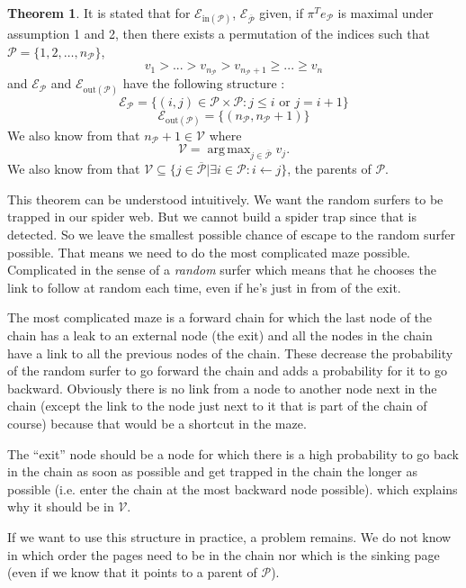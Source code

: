 \documentclass{article}
\DeclareMathOperator*{\argmax}{arg\,max}
\newcommand{\1}{\mathbf{1}}
\theoremstyle{definition}
\newtheorem{mytheo}[mydef]{Theorem}
\begin{document}
\begin{mytheo}
  It is stated that for \(\mathcal{E}_{\text{in}(\mathcal{P})}\), \(\mathcal{E}_{\overline{\mathcal{P}}}\) given, if  \(\pi^T e_{\mathcal{P}}\) is maximal under assumption 1 and 2, then there exists a permutation of the indices such that
\(\mathcal{P} = \{1,2, \hdots, n_{\mathcal{P}}\}\),
\[ v_1 > ... > v_{n_\mathcal{P}}>v_{n_{\mathcal{P}}+1} \geq ... \geq v_n\]
and \(\mathcal{E}_{\mathcal{P}}\) and \(\mathcal{E}_{\text{out}(\mathcal{P})} \) have the following structure :
\[\mathcal{E}_{\mathcal{P}} = \{(i,j) \in \mathcal{P}\times \mathcal{P} : j \leq i \text{ or }j = i+1 \}\]
\[\mathcal{E}_{\text{out}(\mathcal{P})} = \{(n_{\mathcal{P}},n_{\mathcal{P}}+1)\}\]
We also know from \cite{de2008maximizing} that \(n_\mathcal{P}+1 \in \mathcal{V}\) where
\[ \mathcal{V} = \argmax_{j \in \overline{\mathcal{P}}} v_j. \]
We also know from \cite{de2008maximizing} that \(\mathcal{V} \subseteq \{j \in \overline{\mathcal{P}} | \exists i \in \mathcal{P} : i \leftarrow j\}\), the parents of \(\mathcal{P}\).
\label{thm:optstruct}
\end{mytheo}

This theorem can be understood intuitively.
We want the random surfers to be trapped in our spider web.
But we cannot build a spider trap since that is detected.
So we leave the smallest possible chance of escape to the random surfer possible.
That means we need to do the most complicated maze possible.
Complicated in the sense of a \emph{random} surfer which means that he chooses
the link to follow at random each time, even if he's just in from of the exit.

The most complicated maze is a forward chain for which the last node of the chain has a leak to an external node (the exit)
and all the nodes in the chain have a link to all the previous nodes of the chain.
These decrease the probability of the random surfer to go forward the chain and adds a probability for it to go backward.
Obviously there is no link from a node to another node next in the chain (except the link to the node just next to it that is part of the chain of course) because that would be a shortcut in the maze.

The ``exit'' node should be a node for which there is a high probability to go back in the chain as soon as possible and get trapped in the chain the longer as possible (i.e. enter the chain at the most backward node possible).
which explains why it should be in \(\mathcal{V}\).

If we want to use this structure in practice, a problem remains.
We do not know in which order the pages need to be in the chain
nor which is the sinking page (even if we know that it points to a parent of \(\mathcal{P}\)).
\end{document}
